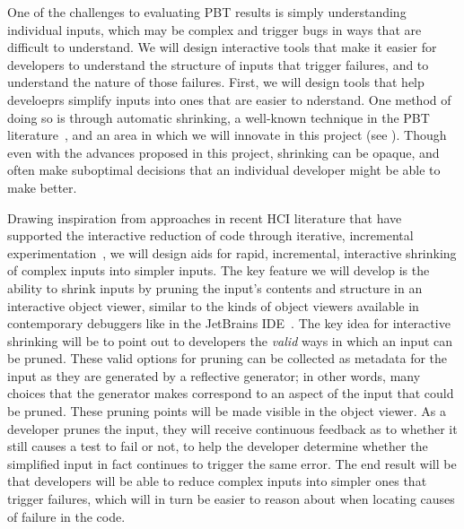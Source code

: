 
%
%
One of the challenges to evaluating PBT results is
simply understanding individual inputs, which may be complex and trigger bugs in
ways that are difficult to understand. We will design interactive tools that
make it easier for developers to understand the structure of inputs that trigger
failures, and to understand the nature of those failures. First, we will design
tools that help develoeprs simplify inputs into ones that are easier to
nderstand. One method of doing so is through automatic shrinking, a well-known
technique in the  PBT
literature~\cite{hughes_quickcheck_2007,arts_shrinking_2014}, and an area in
which we will innovate in this project (see ).  Though
even with the advances proposed in this project, shrinking can be opaque, and
often make suboptimal decisions that an individual developer might be able to
make better.

Drawing inspiration from approaches in recent HCI literature that have supported
the interactive reduction of code through iterative, incremental
experimentation~\cite{ref:lim2018ply,ref:head2018interactive,ref:holmes2012systematizing,ref:hibschman2016telescope},
we will design aids for rapid, incremental, interactive shrinking of complex
inputs into simpler inputs. The key feature we will develop is the ability to
shrink inputs by pruning the input's contents and structure in an interactive
object viewer, similar to the kinds of object viewers available in contemporary
debuggers like in the JetBrains IDE~\cite{tool:jetbrains}. The key idea for
interactive shrinking will be to point out to developers the \emph{valid} ways
in which an input can be pruned. These valid options for pruning can be
collected as metadata for the input as they are generated by a reflective
generator; in other words, many choices that the generator makes correspond to
an aspect of the input that could be pruned. These pruning points will be made
visible in the object viewer. As a developer prunes the input, they will receive
continuous feedback as to whether it still causes a test to fail or not, to help
the developer determine whether the simplified input in fact continues to
trigger the same error. The end result will be that developers will be able to
reduce complex inputs into simpler ones that trigger failures, which will in
turn be easier to reason about when locating causes of failure in the code.

